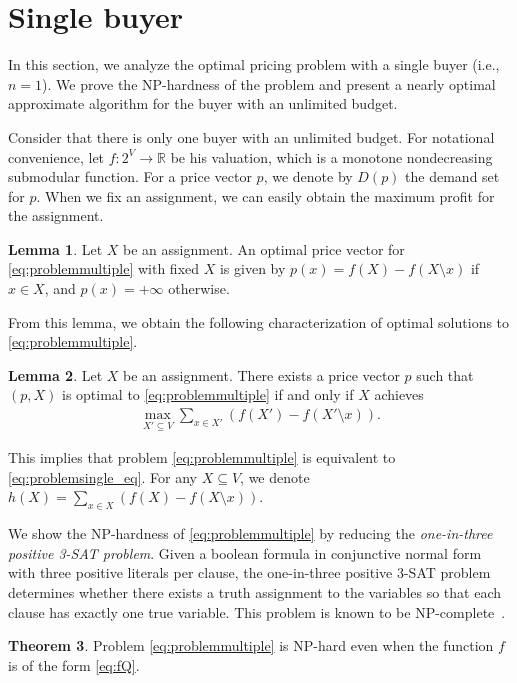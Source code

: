 \documentclass[letterpaper]{article}
\theoremstyle{definition}
\newtheorem{theorem}{Theorem}
\newtheorem{lemma}[theorem]{Lemma}
\begin{document}
\section{Single buyer}
\label{sec:single}

In this section, we analyze the optimal pricing problem with a single buyer (i.e., $n=1$).
We prove the NP-hardness of the problem and present a nearly optimal approximate algorithm for the buyer with an unlimited budget.

Consider that there is only one buyer with an unlimited budget.
For notational convenience, let $f: 2^V \to \mathbb{R}$ be his valuation, which is a monotone nondecreasing submodular function.
For a price vector $p$, we denote by $D(p)$ the demand set for $p$.
When we fix an assignment, we can easily obtain the maximum profit for the assignment.
\begin{lemma}\label{lem:single_obs}
Let $X$ be an assignment.
An optimal price vector for \eqref{eq:problemmultiple} with fixed $X$ is given by
$p(x) = f(X)-f(X \setminus x)$ if $x \in X$, and $p(x)=+\infty$ otherwise.
\end{lemma}
From this lemma, we obtain the following characterization of optimal solutions to \eqref{eq:problemmultiple}.
\begin{lemma}\label{lem:Dtoh}
Let $X$ be an assignment.
There exists a price vector $p$ such that $(p, X)$ is optimal to  \eqref{eq:problemmultiple} if and only if $X$ achieves
\begin{align}\label{eq:problemsingle_eq}
\textstyle
  \max_{X' \subseteq V} \sum_{x \in X'} (f(X') - f(X' \setminus x)).
\end{align}
\end{lemma}
This implies that problem \eqref{eq:problemmultiple} is equivalent to \eqref{eq:problemsingle_eq}.
For any $X \subseteq V$, we denote \(h(X) = \sum_{x \in X} (f(X) - f(X \setminus x))\).

We show the NP-hardness of \eqref{eq:problemmultiple} by reducing the \emph{one-in-three positive 3-SAT problem}.
Given a boolean formula in conjunctive normal form with three positive literals per clause, the one-in-three positive 3-SAT problem determines whether there exists a truth assignment to the variables so that each clause has exactly one true variable.
This problem is known to be NP-complete~\cite{schaefer1978complexity}.

\begin{theorem}
\label{thm:NPhard}
Problem \eqref{eq:problemmultiple} is NP-hard even when the function $f$ is of the form \eqref{eq:fQ}.
\end{theorem}
\end{document}
